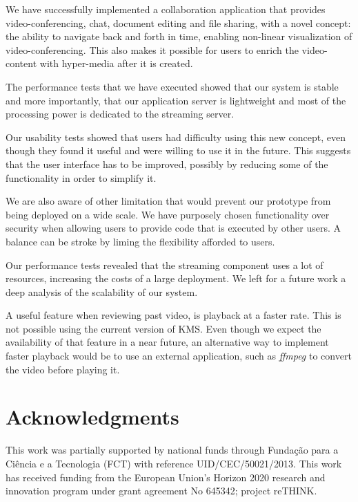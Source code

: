 \documentclass[10pt,conference]{IEEEtran}
\begin{document}
We have successfully implemented a collaboration application that provides video-conferencing, chat, document editing and file sharing, with a novel concept: the ability to navigate back and forth in time, enabling non-linear visualization of video-conferencing.
This also makes it possible for users to enrich the video-content with hyper-media after it is created.

The performance tests that we have executed showed that our system is stable and more importantly, that our application server is lightweight and most of the processing power is dedicated to the streaming server.

Our usability tests showed that users had difficulty using this new concept, even though they found it useful and were willing to use it in the future.
This suggests that the user interface has to be improved, possibly by reducing some of the functionality in order to simplify it.

We are also aware of other limitation that would prevent our prototype from being deployed on a wide scale.
We have purposely chosen functionality over security when allowing users to provide code that is executed by other users.
A balance can be stroke by liming the flexibility afforded to users.

Our performance tests revealed that the streaming component uses a lot of resources, increasing the costs of a large deployment.
We left for a future work a deep analysis of the scalability of our system.

A useful feature when reviewing past video, is playback at a faster rate.
This is not possible using the current version of \gls{KMS}.
Even though we expect the availability of that feature in a near future, an alternative way to implement faster playback would be to use an external application, such as \emph{ffmpeg} to convert the video before playing it.

\section*{Acknowledgments}

This work was partially supported by national funds through Fundação para a Ciência e a Tecnologia (FCT) with reference UID/CEC/50021/2013.
This work has received funding from the European Union’s Horizon 2020 research and innovation program under grant agreement No 645342; project reTHINK.





\end{document}

